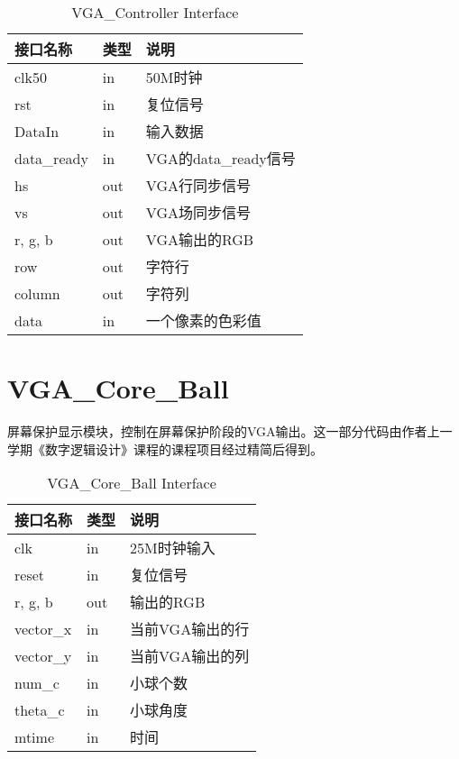 \begin{center}
\renewcommand{\arraystretch}{1.3}
\small
\begin{longtable}{|p{3cm}<{\centering}|p{1.4cm}<{\centering}|p{7cm}<{\centering}|}
\caption{VGA\_Controller Interface}
\label{tab:treatments}\\
\hline
接口名称 & 类型 & 说明 \\\hline
clk50 & in & 50M时钟 \\\hline
rst & in  & 复位信号 \\\hline
DataIn & in  & 输入数据 \\\hline
data\_ready & in & VGA的data\_ready信号\\\hline
hs & out & VGA行同步信号\\\hline
vs & out & VGA场同步信号\\\hline
r, g, b & out & VGA输出的RGB \\\hline
row & out & 字符行 \\\hline
column & out & 字符列 \\\hline
data & in & 一个像素的色彩值 \\\hline
\end{longtable}
\end{center}


\section{VGA\_Core\_Ball}

屏幕保护显示模块，控制在屏幕保护阶段的VGA输出。这一部分代码由作者上一学期《数字逻辑设计》课程的课程项目经过精简后得到。

\begin{center}
\renewcommand{\arraystretch}{1.3}
\small
\begin{longtable}{|p{3cm}<{\centering}|p{1.4cm}<{\centering}|p{7cm}<{\centering}|}
\caption{VGA\_Core\_Ball Interface}
\label{tab:treatments}\\
\hline
接口名称 & 类型 & 说明 \\\hline
clk & in & 25M时钟输入 \\\hline
reset & in  & 复位信号 \\\hline
r, g, b & out & 输出的RGB \\\hline
vector\_x & in & 当前VGA输出的行 \\\hline
vector\_y & in & 当前VGA输出的列 \\\hline
num\_c & in & 小球个数 \\\hline
theta\_c & in & 小球角度 \\\hline
mtime  & in & 时间 \\\hline
\end{longtable}
\end{center}



